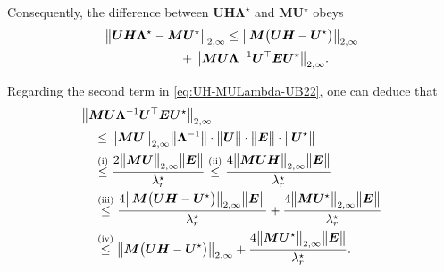 %
Consequently, the difference between $\bm{U}\bm{H}\bm{\Lambda}^{\star}$ and $\bm{M}\bm{U}^{\star}$ obeys
%
\begin{align}
 & \big\|\bm{U}\bm{H}\bm{\Lambda}^{\star}-\bm{M}\bm{U}^{\star}\big\|_{2,\infty}
  \leq \big\|\bm{M}\big(\bm{U}\bm{H}-\bm{U}^{\star}\big)\big\|_{2,\infty}  \notag\\
	& \qquad\qquad\qquad +\big\|\bm{M}\bm{U}\bm{\Lambda}^{-1}\bm{U}^{\top}\bm{E}\bm{U}^{\star}\big\|_{2,\infty}.
\label{eq:UH-MULambda-UB22}
\end{align}
%


%
Regarding the second term in \eqref{eq:UH-MULambda-UB22}, one can deduce that
\begin{align}
 & \big\|\bm{M}\bm{U}\bm{\Lambda}^{-1}\bm{U}^{\top}\bm{E}\bm{U}^{\star}\big\|_{2,\infty} \notag\\
 & \quad \leq\big\|\bm{M}\bm{U}\big\|_{2,\infty}\big\|\bm{\Lambda}^{-1}\big\|\cdot\big\|\bm{U}\big\|\cdot\big\|\bm{E}\big\|\cdot\big\|\bm{U}^{\star}\big\| \notag\\
 & \quad \overset{(\mathrm{i})}{\leq}\frac{2\big\|\bm{M}\bm{U}\big\|_{2,\infty}\big\|\bm{E}\big\|}{\lambda_{r}^{\star}}\overset{(\mathrm{ii})}{\leq}\frac{4\big\|\bm{M}\bm{U}\bm{H}\big\|_{2,\infty}\big\|\bm{E}\big\|}{\lambda_{r}^{\star}} \notag\\
	& \quad \overset{(\mathrm{iii})}{\leq} \frac{4\big\|\bm{M}\big(\bm{U}\bm{H}-\bm{U}^{\star}\big)\big\|_{2,\infty}\big\|\bm{E}\big\|}{ \lambda_{r}^{\star}  }
	+ \frac{4\big\|\bm{M}\bm{U}^{\star}\big\|_{2,\infty}\big\|\bm{E}\big\|}{\lambda_{r}^{\star}} \notag\\
	& \quad \overset{(\mathrm{iv})}{\leq} \big\|\bm{M}\big(\bm{U}\bm{H}-\bm{U}^{\star}\big)\big\|_{2,\infty}
	+ \frac{4\big\|\bm{M}\bm{U}^{\star}\big\|_{2,\infty}\big\|\bm{E}\big\|}{\lambda_{r}^{\star}} .
	\label{eq:M-UH-U-diff-UB5678}
\end{align}
